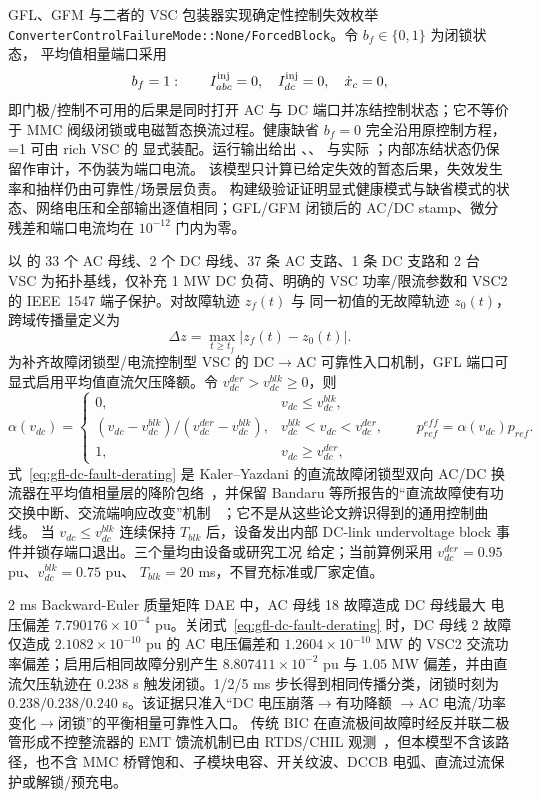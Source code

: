 GFL、GFM 与二者的 VSC 包装器实现确定性控制失效枚举
\texttt{ConverterControlFailureMode::None/ForcedBlock}。令 $b_f\in\{0,1\}$ 为闭锁状态，
平均值相量端口采用
\[
 b_f=1:\qquad I_{abc}^{\rm inj}=0,\quad I_{dc}^{\rm inj}=0,\quad
 \dot x_c=0,
\]
即门极/控制不可用的后果是同时打开 AC 与 DC 端口并冻结控制状态；它不等价于
MMC 阀级闭锁或电磁暂态换流过程。健康缺省 $b_f=0$ 完全沿用原控制方程，
=1 可由 rich VSC 的
 显式装配。运行输出给出
、、 与实际
；内部冻结状态仍保留作审计，不伪装为端口电流。
该模型只计算已给定失效的暂态后果，失效发生率和抽样仍由可靠性/场景层负责。
构建级验证证明显式健康模式与缺省模式的状态、网络电压和全部输出逐值相同；GFL/GFM
闭锁后的 AC/DC stamp、微分残差和端口电流均在 $10^{-12}$ 门内为零。

 以
 的 33 个 AC 母线、2 个 DC 母线、37 条 AC
支路、1 条 DC 支路和 2 台 VSC 为拓扑基线，仅补充 1 MW DC 负荷、明确的
VSC 功率/限流参数和 VSC2 的 IEEE~1547 端子保护。对故障轨迹 $z_f(t)$ 与
同一初值的无故障轨迹 $z_0(t)$，跨域传播量定义为
\[
 \Delta z=\max_{t\ge t_f}|z_f(t)-z_0(t)|.
\]
为补齐故障闭锁型/电流控制型 VSC 的 DC$\rightarrow$AC 可靠性入口机制，GFL
端口可显式启用平均值直流欠压降额。令 $v_{dc}^{der}>v_{dc}^{blk}\geq0$，则
\begin{equation}
 \alpha(v_{dc})=
 \begin{cases}
 0, & v_{dc}\leq v_{dc}^{blk},\\
 (v_{dc}-v_{dc}^{blk})/(v_{dc}^{der}-v_{dc}^{blk}),
      & v_{dc}^{blk}<v_{dc}<v_{dc}^{der},\\
 1, & v_{dc}\geq v_{dc}^{der},
 \end{cases}
 \qquad p_{ref}^{eff}=\alpha(v_{dc})p_{ref}.
 \label{eq:gfl-dc-fault-derating}
\end{equation}
式~\eqref{eq:gfl-dc-fault-derating} 是 Kaler--Yazdani 的直流故障闭锁型双向
AC/DC 换流器在平均值相量层的降阶包络~\cite{dyninv:kaler2022}，并保留
Bandaru 等所报告的“直流故障使有功交换中断、交流端响应改变”机制
~\cite{dyninv:bandaru2024}；它不是从这些论文辨识得到的通用控制曲线。
当 $v_{dc}\leq v_{dc}^{blk}$ 连续保持 $T_{blk}$ 后，设备发出内部
DC-link undervoltage block 事件并锁存端口退出。三个量均由设备或研究工况
给定；当前算例采用 $v_{dc}^{der}=0.95$ pu、$v_{dc}^{blk}=0.75$ pu、
$T_{blk}=20$ ms，不冒充标准或厂家定值。

2 ms Backward-Euler 质量矩阵 DAE 中，AC 母线 18 故障造成 DC 母线最大
电压偏差 $7.790176\times10^{-4}$ pu。关闭式~\eqref{eq:gfl-dc-fault-derating}
时，DC 母线 2 故障仅造成 $2.1082\times10^{-10}$ pu 的 AC 电压偏差和
$1.2604\times10^{-10}$ MW 的 VSC2 交流功率偏差；启用后相同故障分别产生
$8.807411\times10^{-2}$ pu 与 $1.05$ MW 偏差，并由直流欠压轨迹在
$0.238$ s 触发闭锁。1/2/5 ms 步长得到相同传播分类，闭锁时刻为
$0.238/0.238/0.240$ s。该证据只准入“DC 电压崩落$\rightarrow$有功降额
$\rightarrow$AC 电流/功率变化$\rightarrow$闭锁”的平衡相量可靠性入口。
传统 BIC 在直流极间故障时经反并联二极管形成不控整流器的 EMT 馈流机制已由
RTDS/CHIL 观测~\cite{dyninv:pandey2025}，但本模型不含该路径，也不含 MMC
桥臂饱和、子模块电容、开关纹波、DCCB 电弧、直流过流保护或解锁/预充电。

